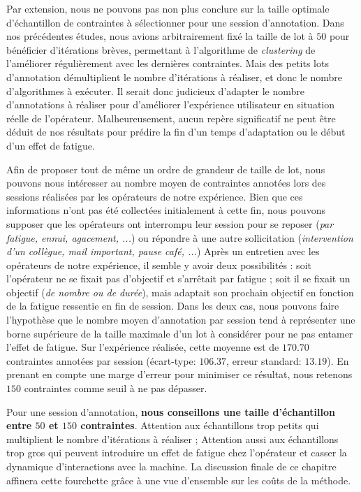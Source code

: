 			Par extension, nous ne pouvons pas non plus conclure sur la taille optimale d'échantillon de contraintes à sélectionner pour une session d'annotation.
			Dans nos précédentes études, nous avions arbitrairement fixé la taille de lot à $50$ pour bénéficier d'itérations brèves, permettant à l'algorithme de \textit{clustering} de l'améliorer régulièrement avec les dernières contraintes.
			Mais des petits lots d'annotation démultiplient le nombre d'itérations à réaliser, et donc le nombre d'algorithmes à exécuter.
			Il serait donc judicieux d'adapter le nombre d'annotations à réaliser pour d'améliorer l'expérience utilisateur en situation réelle de l'opérateur.
			Malheureusement, aucun repère significatif ne peut être déduit de nos résultats pour prédire la fin d'un temps d'adaptation ou le début d'un effet de fatigue.
			
			Afin de proposer tout de même un ordre de grandeur de taille de lot, nous pouvons nous intéresser au nombre moyen de contraintes annotées lors des sessions réalisées par les opérateurs de notre expérience.
			Bien que ces informations n'ont pas été collectées initialement à cette fin, nous pouvons supposer que les opérateurs ont interrompu leur session pour se reposer (\textit{par fatigue, ennui, agacement, ...}) ou répondre à une autre sollicitation (\textit{intervention d'un collègue, mail important, pause café, ...})
			Après un entretien avec les opérateurs de notre expérience, il semble y avoir deux possibilités : soit l'opérateur ne se fixait pas d'objectif et s'arrêtait par fatigue ; soit il se fixait un objectif (\textit{de nombre ou de durée}), mais adaptait son prochain objectif en fonction de la fatigue ressentie en fin de session.
			Dans les deux cas, nous pouvons faire l'hypothèse que le nombre moyen d'annotation par session tend à représenter une borne supérieure de la taille maximale d'un lot à considérer pour ne pas entamer l'effet de fatigue.
			Sur l'expérience réalisée, cette moyenne est de $170.70$ contraintes annotées par session (écart-type: $106.37$, erreur standard: $13.19$).
			En prenant en compte une marge d'erreur pour minimiser ce résultat, nous retenons $150$ contraintes comme seuil à ne pas dépasser.
			
			\begin{leftBarSummary}
				Pour une session d'annotation, \textbf{nous conseillons une taille d'échantillon entre $50$ et $150$ contraintes}.
				Attention aux échantillons trop petits qui multiplient le nombre d'itérations à réaliser ;
				Attention aussi aux échantillons trop gros qui peuvent introduire un effet de fatigue chez l'opérateur et casser la dynamique d'interactions avec la machine.
				La discussion finale de ce chapitre affinera cette fourchette grâce à une vue d'ensemble sur les coûts de la méthode.
			\end{leftBarSummary}
			

